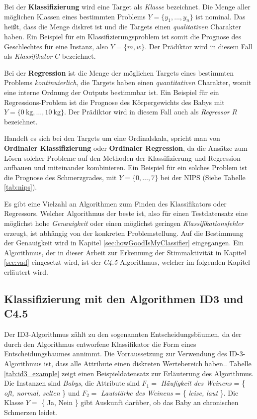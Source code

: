 Bei der \textbf{Klassifizierung} wird eine Target als \emph{Klasse} bezeichnet. Die Menge aller möglichen Klassen eines bestimmten Problems $Y = \{ y_1 , \ldots, y_n\}$ ist nominal. Das heißt, dass die Menge diskret ist und die Targets einen \emph{qualitativen} Charakter haben. Ein Beispiel für ein Klassifizierungsproblem ist somit die Prognose des Geschlechtes für eine Instanz, also $Y = \{m, w\}$. Der Prädiktor wird in diesem Fall als \emph{Klassifikator} $C$ bezeichnet.

Bei der \textbf{Regression} ist die Menge der möglichen Targets eines bestimmten Problems \emph{kontinuierlich}, die Targets haben einen \emph{quantitativen} Charakter, womit eine interne Ordnung der Outputs bestimmbar ist. Ein Beispiel für ein Regressions-Problem ist die Prognose des Körpergewichts des Babys mit $Y = \{ \SI{0}{\kilo\gram} , \ldots , \SI{10}{\kilo\gram} \}$. Der Prädiktor wird in diesem Fall auch als \emph{Regressor} $R$ bezeichnet.\cite[S. 24]{learning_cart_dobra} \cite[S. 8]{machine_marsland} \cite[S. 28]{statistical_learning}

Handelt es sich bei den Targets um eine Ordinalskala, spricht man von \textbf{Ordinaler Klassifizierung} oder \textbf{Ordinaler Regression}, da die Ansätze zum Lösen solcher Probleme auf den Methoden der Klassifizierung und Regression aufbauen und miteinander kombinieren.\cite[S. 1]{ordinalClassification} Ein Beispiel für ein solches Problem ist die Prognose des Schmerzgrades, mit $Y = \{ 0 , \ldots, 7  \}$ bei der NIPS (Siehe Tabelle \ref{tab:nips}).

Es gibt eine Vielzahl an Algorithmen zum Finden des Klassifikators oder Regressors. Welcher Algorithmus der \glqq beste\grqq{} ist, also für einen Testdatensatz eine möglichst hohe \emph{Genauigkeit} oder einen möglichst geringen \emph{Klassifikationsfehler} erzeugt, ist abhängig von der konkreten Problemstellung. Auf die Bestimmung der Genauigkeit wird in Kapitel \ref{sec:howGoodIsMyClassifier} eingegangen. Ein Algorithmus, der in dieser Arbeit zur Erkennung der Stimmaktivität in Kapitel \ref{sec:vad} eingesetzt wird, ist der \emph{C4.5}-Algorithmus, welcher im folgenden Kapitel erläutert wird.

\subsection{Klassifizierung mit den Algorithmen ID3 und C4.5}
\label{sec:id3}

Der ID3-Algorithmus zählt zu den sogenannten Entscheidungsbäumen, da der durch den Algorithmus entworfene Klassifikator die Form eines Entscheidungsbaumes annimmt. Die Vorraussetzung zur Verwendung des ID-3-Algorithmus ist, dass alle Attribute einen diskreten Wertebereich haben.\cite[S. 54]{machine_mitchell}. Tabelle \ref{tab:id3_example} zeigt einen Beispieldatensatz zur Erläuterung des Algorithmus. Die Instanzen sind \emph{Babys}, die Attribute sind $F_1 = $ \emph{Häufigkeit des Weinens} = \{ \emph{oft, normal, selten} \} und $F_2 = $ \emph{Lautstärke des Weinens} = \{ \emph{leise, laut} \}. Die Klasse $Y = $ \{ Ja, Nein \} gibt Auskunft darüber, ob das Baby an chronischen Schmerzen leidet. 

